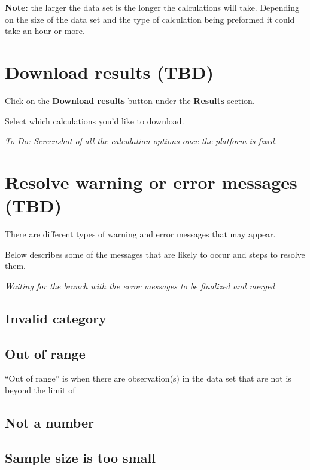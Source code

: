 \documentclass[]{book}
\begin{document}
\textbf{Note:} the larger the data set is the longer the calculations
will take. Depending on the size of the data set and the type of
calculation being preformed it could take an hour or more.

\section{Download results (TBD)}\label{download-results-tbd}

Click on the \textbf{Download results} button under the \textbf{Results}
section.

Select which calculations you'd like to download.

\emph{To Do: Screenshot of all the calculation options once the platform
is fixed.}

\section{Resolve warning or error messages
(TBD)}\label{resolve-warning-or-error-messages-tbd}

There are different types of warning and error messages that may appear.

Below describes some of the messages that are likely to occur and steps
to resolve them.

\emph{Waiting for the branch with the error messages to be finalized and
merged}

\subsection{Invalid category}\label{invalid-category}

\subsection{Out of range}\label{out-of-range}

``Out of range'' is when there are observation(s) in the data set that
are not is beyond the limit of

\subsection{Not a number}\label{not-a-number}

\subsection{Sample size is too small}\label{sample-size-is-too-small}
\end{document}

